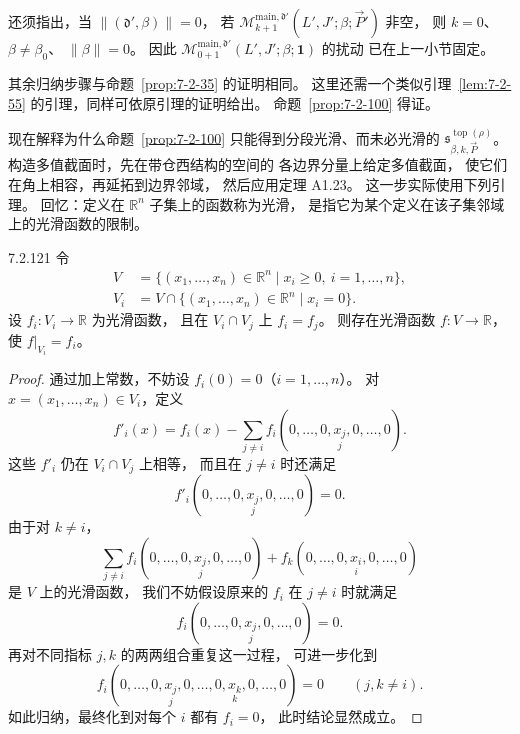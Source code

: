 还须指出，当 $\|(\mathfrak d',\beta)\|=0$，
若
$\mathcal M^{\mathrm{main},\mathfrak d'}_{k+1}
(L',J';\beta;\vec P')$ 非空，
则 $k=0$、$\beta\ne\beta_0$、
$\|\beta\|=0$。
因此
$\mathcal M^{\mathrm{main},\mathfrak d'}_{0+1}
(L',J';\beta;\mathbf 1)$ 的扰动
已在上一小节固定。

其余归纳步骤与命题~\ref{prop:7-2-35}
的证明相同。
这里还需一个类似引理~\ref{lem:7-2-55}
的引理，同样可依原引理的证明给出。
命题~\ref{prop:7-2-100} 得证。

现在解释为什么命题~\ref{prop:7-2-100}
只能得到分段光滑、而未必光滑的
$\mathfrak s^{\operatorname{top}(\rho)}_{\beta,k,\vec P}$。
构造多值截面时，先在带仓西结构的空间的
各边界分量上给定多值截面，
使它们在角上相容，再延拓到边界邻域，
然后应用定理 A1.23。
这一步实际使用下列引理。
回忆：定义在 $\mathbb R^n$ 子集上的函数称为光滑，
是指它为某个定义在该子集邻域上的光滑函数的限制。

\begin{lemma}{7.2.121}\label{lem:7-2-121}
令
\[
\begin{aligned}
V&=\{(x_1,\ldots,x_n)\in\mathbb R^n
\mid x_i\ge0,\ i=1,\ldots,n\},\\
V_i&=V\cap\{(x_1,\ldots,x_n)\in\mathbb R^n
\mid x_i=0\}.
\end{aligned}
\]
设 $f_i\colon V_i\to\mathbb R$ 为光滑函数，
且在 $V_i\cap V_j$ 上 $f_i=f_j$。
则存在光滑函数 $f\colon V\to\mathbb R$，
使 $f|_{V_i}=f_i$。
\end{lemma}
\begin{proof}
通过加上常数，不妨设
$f_i(0)=0$（$i=1,\ldots,n$）。
对 $x=(x_1,\ldots,x_n)\in V_i$，定义
\[
f'_i(x)=f_i(x)-
\sum_{j\ne i}f_i(0,\ldots,0,
\underset{j}{x_j},0,\ldots,0).
\]
这些 $f'_i$ 仍在 $V_i\cap V_j$ 上相等，
而且在 $j\ne i$ 时还满足
\[
f'_i(0,\ldots,0,\underset{j}{x_j},0,\ldots,0)=0.
\]
由于对 $k\ne i$，
\[
\sum_{j\ne i}
f_i(0,\ldots,0,\underset{j}{x_j},0,\ldots,0)
+f_k(0,\ldots,0,\underset{i}{x_i},0,\ldots,0)
\]
是 $V$ 上的光滑函数，
我们不妨假设原来的 $f_i$ 在
$j\ne i$ 时就满足
\[
f_i(0,\ldots,0,\underset{j}{x_j},0,\ldots,0)=0.
\]
再对不同指标 $j,k$ 的两两组合重复这一过程，
可进一步化到
\[
f_i(0,\ldots,0,\underset{j}{x_j},0,\ldots,0,
\underset{k}{x_k},0,\ldots,0)=0
\qquad(j,k\ne i).
\]
如此归纳，最终化到对每个 $i$ 都有 $f_i=0$，
此时结论显然成立。
\end{proof}

